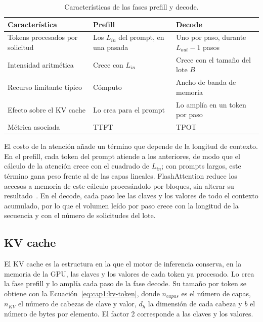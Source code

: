 \begin{table}[htbp]
  \centering
  \caption{Características de las fases prefill y decode.}
  \label{tab:cap1:fases}
  \small
  \begin{tabular}{|p{}|p{}|p{}|}
    \hline
    \textbf{Característica} & \textbf{Prefill} & \textbf{Decode} \\
    \hline
    Tokens procesados por solicitud & Los $L_{in}$ del prompt, en una pasada & Uno por paso, durante $L_{out} - 1$ pasos \\
    \hline
    Intensidad aritmética & Crece con $L_{in}$ & Crece con el tamaño del lote $B$ \\
    \hline
    Recurso limitante típico & Cómputo & Ancho de banda de memoria \\
    \hline
    Efecto sobre el KV cache & Lo crea para el prompt & Lo amplía en un token por paso \\
    \hline
    Métrica asociada & TTFT & TPOT \\
    \hline
  \end{tabular}
\end{table}

El costo de la atención añade un término que depende de la longitud de contexto. En el prefill, cada token del prompt atiende a los anteriores, de modo que el cálculo de la atención crece con el cuadrado de $L_{in}$; con prompts largos, este término gana peso frente al de las capas lineales. FlashAttention reduce los accesos a memoria de este cálculo procesándolo por bloques, sin alterar su resultado~\cite{dao2022flashattention}. En el decode, cada paso lee las claves y los valores de todo el contexto acumulado, por lo que el volumen leído por paso crece con la longitud de la secuencia y con el número de solicitudes del lote.

\subsection{KV cache}
\label{sec:cap1:kvcache}

El KV cache es la estructura en la que el motor de inferencia conserva, en la memoria de la GPU, las claves y los valores de cada token ya procesado. Lo crea la fase prefill y lo amplía cada paso de la fase decode. Su tamaño por token se obtiene con la Ecuación~\ref{eq:cap1:kv-token}, donde $n_{capas}$ es el número de capas, $n_{KV}$ el número de cabezas de clave y valor, $d_h$ la dimensión de cada cabeza y $b$ el número de bytes por elemento. El factor 2 corresponde a las claves y los valores.

